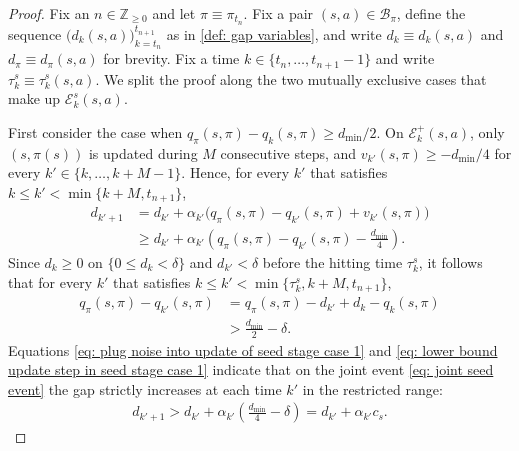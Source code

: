 \begin{proof}
Fix an $n \in \mathbb Z_{\ge 0}$ and let $\pi \equiv \pi_{t_n}$.
Fix a pair $(s,a) \in \mathcal B_\pi$,
define the sequence $\big( d_k(s,a) \big)_{k=t_n}^{t_{n+1}}$ as in \autoref{def: gap variables}, and write $d_k \equiv d_k(s,a)$ and $d_\pi \equiv d_\pi(s,a)$ for brevity.
Fix a time $k \in \{t_n, \dots, t_{n+1}-1\}$ and write $\tau^s_k \equiv \tau^s_k(s,a)$.
We split the proof along the two mutually exclusive cases that make up $\mathcal E^s_k(s,a)$.


First consider the case when $q_\pi(s,\pi) - q_{k}(s,\pi) \ge d_{\min}/2$.
On $\mathcal E^+_k(s,a)$, only $(s, \pi(s))$ is updated during $M$ consecutive steps,
and $v_{k'}(s,\pi) \ge -d_{\min}/4$ for every $k' \in \{k, \dots, k+M-1\}$.
Hence, for every $k'$ that satisfies 
$k \le k' < \min\{k+M, t_{n+1} \}$,
\begin{align}
\nonumber
    d_{k'+1}
    &= d_{k'} + \alpha_{k'} \big( q_\pi(s,\pi) - q_{k'}(s,\pi) + v_{k'}(s,\pi) \big)
    \\
\label{eq: plug noise into update of seed stage case 1}
    &\ge d_{k'} + \alpha_{k'} \left( q_\pi(s,\pi) - q_{k'}(s,\pi) -\frac{d_{\min}}{4} \right) .
\end{align}
Since $d_{k} \ge 0$ on $\{0 \le d_{k} < \delta \}$
and $d_{k'} < \delta$ before the hitting time $\tau^s_k$,
it follows that for every $k'$ that satisfies 
$k \le k' < \min \{ \tau^s_k, k+M, t_{n+1} \}$,
\begin{align}
\nonumber
    q_\pi(s,\pi) - q_{k'}(s,\pi)
    &= q_\pi(s,\pi) - d_{k'} + d_{k} - q_{k}(s,\pi)
    \\
\label{eq: lower bound update step in seed stage case 1}
    &> \frac{d_{\min}}{2} - \delta .
\end{align}
Equations \eqref{eq: plug noise into update of seed stage case 1} and \eqref{eq: lower bound update step in seed stage case 1}
indicate that on the joint event \eqref{eq: joint seed event}
the gap strictly increases at each time $k'$ in the restricted range:
\begin{align}
\label{eq: final lower bound case 1}
    d_{k'+1}
    > d_{k'} + \alpha_{k'} \left( \frac{d_{\min}}{4} - \delta \right)
    = d_{k'} + \alpha_{k'} c_s .
\end{align}


\end{proof}
